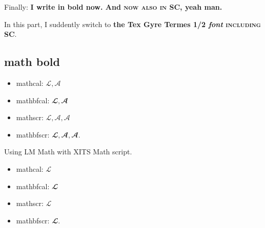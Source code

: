 \documentclass[version=last, pagesize, twoside=off, bibliography=totoc, DIV=calc, fontsize=14pt, a4paper, french, english]{scrartcl}
\begin{document}
Finally: \textbf{I write in bold now. And \textsc{now also in SC}, yeah man.}

{In this part, I suddently \texgyretermesfamily switch to \textbf{the Tex Gyre Termes 1/2 \textit{font} \textsc{including SC}}.}


\subsection{math bold}
\begin{itemize}
	\item mathcal: $\mathcal{L}, \mathcal{A}$
	\item mathbfcal: $\mathbfcal{L}, \mathbfcal{A}$ 
	\item mathscr: $\mathscr{L}, \mathscr{A}, 𝒜$
	\item mathbfscr: $\mathbfscr{L}, \mathbfscr{A}, 𝓐$.
\end{itemize}

Using LM Math with XITS Math script.
\begin{itemize}
	\item mathcal: $\mathcal{L}$
	\item mathbfcal: $\mathbfcal{L}$ 
	\item mathscr: $\mathscr{L}$
	\item mathbfscr: $\mathbfscr{L}$.
\end{itemize}

%
\end{document}
